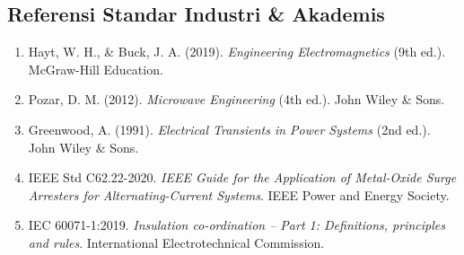 \documentclass[11pt,a4paper]{article}
\theoremstyle{definition}
\begin{document}
\subsection{Referensi Standar Industri \& Akademis}
\begin{enumerate}[leftmargin=*]
    \item Hayt, W. H., \& Buck, J. A. (2019). \textit{Engineering Electromagnetics} (9th ed.). McGraw-Hill Education.
    \item Pozar, D. M. (2012). \textit{Microwave Engineering} (4th ed.). John Wiley \& Sons.
    \item Greenwood, A. (1991). \textit{Electrical Transients in Power Systems} (2nd ed.). John Wiley \& Sons.
    \item IEEE Std C62.22-2020. \textit{IEEE Guide for the Application of Metal-Oxide Surge Arresters for Alternating-Current Systems}. IEEE Power and Energy Society.
    \item IEC 60071-1:2019. \textit{Insulation co-ordination -- Part 1: Definitions, principles and rules}. International Electrotechnical Commission.
\end{enumerate}
\end{document}
